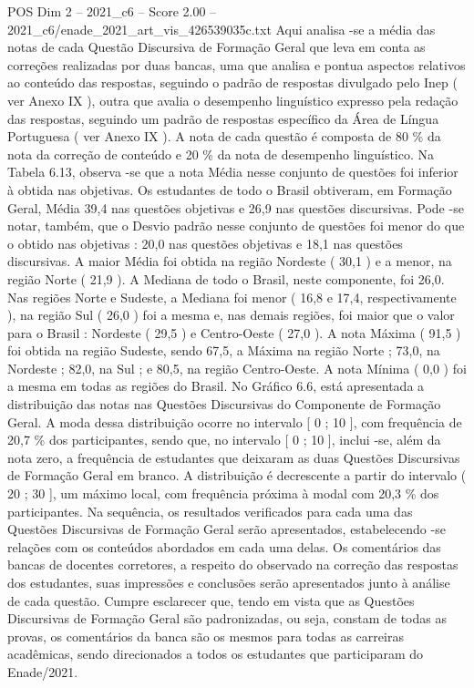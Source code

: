 \begin{textsample}{POS Dim 2 – 2021\_c6 – Score 2.00 – 2021\_c6/enade\_2021\_art\_vis\_426539035c.txt}
Aqui analisa -se a média das notas de cada Questão Discursiva de Formação Geral que leva em conta as correções realizadas por duas bancas, uma que analisa e pontua aspectos relativos ao conteúdo das respostas, seguindo o padrão de respostas divulgado pelo Inep ( ver Anexo IX ), outra que avalia o desempenho linguístico expresso pela redação das respostas, seguindo um padrão de respostas específico da Área de Língua Portuguesa ( ver Anexo IX ).
A nota de cada questão é composta de 80 \% da nota da correção de conteúdo e 20 \% da nota de desempenho linguístico.
Na Tabela 6.13, observa -se que a nota Média nesse conjunto de questões foi inferior à obtida nas objetivas.
Os estudantes de todo o Brasil obtiveram, em Formação Geral, Média 39,4 nas questões objetivas e 26,9 nas questões discursivas.
Pode -se notar, também, que o Desvio padrão nesse conjunto de questões foi menor do que o obtido nas objetivas : 20,0 nas questões objetivas e 18,1 nas questões discursivas.
A maior Média foi obtida na região Nordeste ( 30,1 ) e a menor, na região Norte ( 21,9 ).
A Mediana de todo o Brasil, neste componente, foi 26,0.
Nas regiões Norte e Sudeste, a Mediana foi menor ( 16,8 e 17,4, respectivamente ), na região Sul ( 26,0 ) foi a mesma e, nas demais regiões, foi maior que o valor para o Brasil : Nordeste ( 29,5 ) e Centro-Oeste ( 27,0 ).
A nota Máxima ( 91,5 ) foi obtida na região Sudeste, sendo 67,5, a Máxima na região Norte ; 73,0, na Nordeste ; 82,0, na Sul ; e 80,5, na região Centro-Oeste.
A nota Mínima ( 0,0 ) foi a mesma em todas as regiões do Brasil.
No Gráfico 6.6, está apresentada a distribuição das notas nas Questões Discursivas do Componente de Formação Geral.
A moda dessa distribuição ocorre no intervalo [ 0 ; 10 ], com frequência de 20,7 \% dos participantes, sendo que, no intervalo [ 0 ; 10 ], inclui -se, além da nota zero, a frequência de estudantes que deixaram as duas Questões Discursivas de Formação Geral em branco.
A distribuição é decrescente a partir do intervalo ( 20 ; 30 ], um máximo local, com frequência próxima à modal com 20,3 \% dos participantes.
Na sequência, os resultados verificados para cada uma das Questões Discursivas de Formação Geral serão apresentados, estabelecendo -se relações com os conteúdos abordados em cada uma delas.
Os comentários das bancas de docentes corretores, a respeito do observado na correção das respostas dos estudantes, suas impressões e conclusões serão apresentados junto à análise de cada questão.
Cumpre esclarecer que, tendo em vista que as Questões Discursivas de Formação Geral são padronizadas, ou seja, constam de todas as provas, os comentários da banca são os mesmos para todas as carreiras acadêmicas, sendo direcionados a todos os estudantes que participaram do Enade/2021.

\end{textsample}
